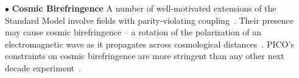 \documentclass[PICOAPC.tex]{subfiles}
\begin{document}
$\bullet$ {\bf Cosmic Birefringence} \hspace{0.1in}
A number of well-motivated extensions of the Standard Model involve fields with parity-violating coupling~\citep{Freese:1990rb,Frieman:1995pm,Carroll:1998zi,Kaloper:2005aj,Carroll:1998zi,2008PhRvL.101n1101C,Gluscevic:2010vv}. Their presence may cause cosmic birefringence -- a rotation of the polarization of an electromagnetic wave as it propagates across cosmological distances~\cite{Harari:1992ea,Carroll:1989vb,Carroll:1998zi}. PICO's constraints on cosmic birefringence are more stringent than any other next decade experiment~\cite{pogosian_2019}. 
\end{document}
